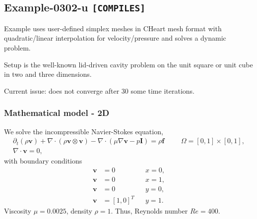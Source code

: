 %
\clearpage
%
\subsection{Example-0302-u \texttt{[COMPILES]}}
%
Example uses user-defined simplex meshes in CHeart mesh format with
quadratic/linear interpolation for velocity/pressure
and solves a dynamic problem.

Setup is the well-known lid-driven cavity problem
on the unit square or unit cube in two and three dimensions.

Current issue: does not converge after 30 some time iterations.
%
%
\subsubsection{Mathematical model - 2D}
%
We solve the incompressible Navier-Stokes equation,
%
\begin{align}
    \partial_{t} (\rho \boldsymbol{v}) + \nabla \cdot (\rho \boldsymbol{v} \otimes \boldsymbol{v}) - \nabla \cdot (\mu \nabla \boldsymbol{v} - p \boldsymbol{I}) = \rho \boldsymbol{f} & &&\Omega = [0, 1] \times [0, 1], \\
    \nabla \cdot \boldsymbol{v} = 0,
\end{align}
%
with boundary conditions
%
\begin{align}
    \boldsymbol{v} &= 0         &&x = 0, \\
    \boldsymbol{v} &= 0         &&x = 1, \\
    \boldsymbol{v} &= 0         &&y = 0, \\
    \boldsymbol{v} &= [1, 0]^T  &&y = 1.
\end{align}
%
Viscosity $\mu = 0.0025$, density $\rho = 1$. Thus, Reynolds number $Re = 400$.
%
%
